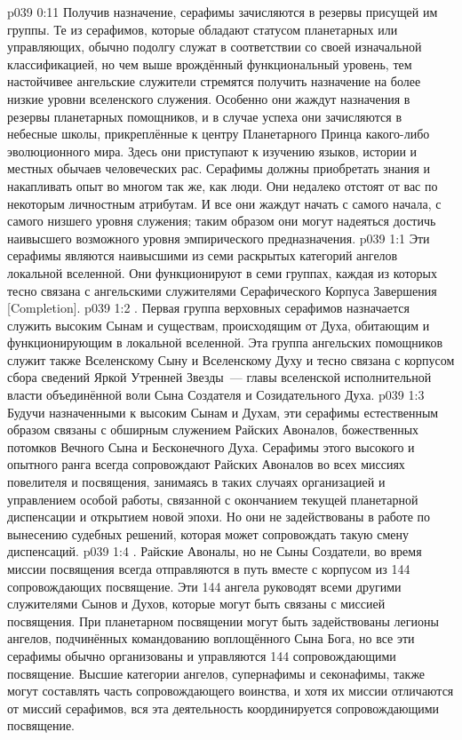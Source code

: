 \vs p039 0:11 Получив назначение, серафимы зачисляются в резервы присущей им группы. Те из серафимов, которые обладают статусом планетарных или управляющих, обычно подолгу служат в соответствии со своей изначальной классификацией, но чем выше врождённый функциональный уровень, тем настойчивее ангельские служители стремятся получить назначение на более низкие уровни вселенского служения. Особенно они жаждут назначения в резервы планетарных помощников, и в случае успеха они зачисляются в небесные школы, прикреплённые к центру Планетарного Принца какого\hyp{}либо эволюционного мира. Здесь они приступают к изучению языков, истории и местных обычаев человеческих рас. Серафимы должны приобретать знания и накапливать опыт во многом так же, как люди. Они недалеко отстоят от вас по некоторым личностным атрибутам. И все они жаждут начать с самого начала, с самого низшего уровня служения; таким образом они могут надеяться достичь наивысшего возможного уровня эмпирического предназначения.
\vs p039 1:1 Эти серафимы являются наивысшими из семи раскрытых категорий ангелов локальной вселенной. Они функционируют в семи группах, каждая из которых тесно связана с ангельскими служителями Серафического Корпуса Завершения [Completion].
\vs p039 1:2 . Первая группа верховных серафимов назначается служить высоким Сынам и существам, происходящим от Духа, обитающим и функционирующим в локальной вселенной. Эта группа ангельских помощников служит также Вселенскому Сыну и Вселенскому Духу и тесно связана с корпусом сбора сведений Яркой Утренней Звезды~--- главы вселенской исполнительной власти объединённой воли Сына Создателя и Созидательного Духа.
\vs p039 1:3 Будучи назначенными к высоким Сынам и Духам, эти серафимы естественным образом связаны с обширным служением Райских Авоналов, божественных потомков Вечного Сына и Бесконечного Духа. Серафимы этого высокого и опытного ранга всегда сопровождают Райских Авоналов во всех миссиях повелителя и посвящения, занимаясь в таких случаях организацией и управлением особой работы, связанной с окончанием текущей планетарной диспенсации и открытием новой эпохи. Но они не задействованы в работе по вынесению судебных решений, которая может сопровождать такую смену диспенсаций.
\vs p039 1:4 \pc {}. Райские Авоналы, но не Сыны Создатели, во время миссии посвящения всегда отправляются в путь вместе с корпусом из 144 сопровождающих посвящение. Эти 144 ангела руководят всеми другими служителями Сынов и Духов, которые могут быть связаны с миссией посвящения. При планетарном посвящении могут быть задействованы легионы ангелов, подчинённых командованию воплощённого Сына Бога, но все эти серафимы обычно организованы и управляются 144 сопровождающими посвящение. Высшие категории ангелов, супернафимы и секонафимы, также могут составлять часть сопровождающего воинства, и хотя их миссии отличаются от миссий серафимов, вся эта деятельность координируется сопровождающими посвящение.
